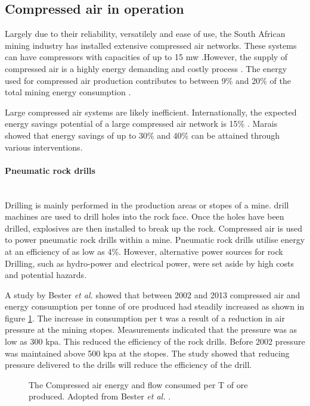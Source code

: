 \subsection{Compressed air in operation}
	Largely due to their reliability, versatilely and ease of use, the South African mining industry has installed extensive compressed air networks. These systems can have compressors with capacities of up to 15 \gls{mw} \cite{Marais2012PhD}.However, the supply of compressed air is a highly energy demanding and costly process \cite{padachi2009energy}.  The energy used for compressed air production contributes to between 9\% and 20\% of the total mining energy consumption	\cite{Eskom2010Energy,du2011development}. 
	\par
	Large compressed air systems are likely inefficient. Internationally, the expected energy savings potential of a large compressed air network is 15\% \cite{neale2009compressed}. Marais \cite{marais2013simplification} showed that energy savings of up to 30\% and 40\% can be attained through various interventions. 
	\paragraph*{Pneumatic rock drills}\leavevmode\\
	 Drilling is mainly performed in the production areas or stopes of a mine. drill machines are used to drill holes into the rock face. Once the holes have been drilled, explosives are then installed to break up the rock. Compressed air is used to power pneumatic rock drills within a mine. Pneumatic rock drills utilise energy at an efficiency of as low as 4\%. However, alternative power sources for rock Drilling, such as hydro-power and electrical power, were set aside by high costs and potential hazards\cite{van2008development}.
	\par 
	 A study by  Bester \textit{et al.} showed that between 2002 and 2013 compressed air and energy consumption per tonne of ore produced had steadily increased as shown in figure \ref{fig: Compressed energy and air flow per ton}. The increase in consumption per \gls{t} was a result of a reduction in air pressure at the mining stopes. Measurements indicated that the pressure was as low as 300 \gls{kpa}. This reduced the efficiency of the rock drills. Before 2002 pressure was maintained above 500 \gls{kpa} at the stopes.  The study showed that reducing pressure delivered to the drills will reduce the efficiency of the drill.\cite{bester2013effect} \par
	\begin{figure}[h]
	\centering
	\fbox{}
	\caption[The Compressed air energy and flow consumed per T of ore produced.]{The Compressed air energy and flow consumed per T of ore produced. Adopted from Bester \textit{et al.} \cite{bester2013effect}.}
	\label{fig: Compressed energy and air flow per ton}
	\end{figure}
